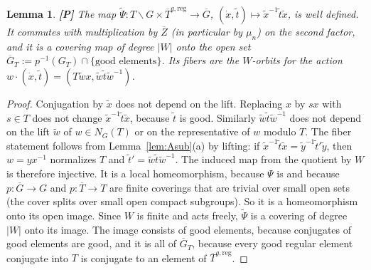 \documentclass[12pt]{article}
\newcommand{\ov}[1]{\overline{#1}}
\newcommand{\reg}{\mathrm{reg}}
\newcommand{\Gb}{\ov{G}}
\newcommand{\Zb}{\ov{Z}}
\newcommand{\Tb}{\ov{T}}
\newcommand{\Pv}{\textbf{[P]}}
\theoremstyle{plain}
\newtheorem{lemma}[theorem]{Lemma}
\theoremstyle{definition}
\begin{document}
\begin{lemma}\label{lem:Acover}\Pv
The map $\tilde\Psi:T\backslash G\times\Tb^{g,\reg}\to\Gb$, $(\dot x,\tilde t)\mapsto\tilde x^{-1}\tilde t\tilde x$, is well defined. It commutes with multiplication by $\Zb$ (in particular by $\mu_n$) on the second factor, and it is a covering map of degree $|W|$ onto the open set $\Gb_T:=p^{-1}(G_T)\cap\{\text{good elements}\}$. Its fibers are the $W$-orbits for the action $w\cdot(\dot x,\tilde t)=(T\tilde w x,\tilde w\tilde t\tilde w^{-1})$.
\end{lemma}
\begin{proof}
Conjugation by $\tilde x$ does not depend on the lift. Replacing $x$ by $sx$ with $s\in T$ does not change $\tilde x^{-1}\tilde t\tilde x$, because $\tilde t$ is good. Similarly $\tilde w\tilde t\tilde w^{-1}$ does not depend on the lift $\tilde w$ of $w\in N_G(T)$ or on the representative of $w$ modulo $T$. The fiber statement follows from Lemma~\ref{lem:Asub}(a) by lifting: if $\tilde x^{-1}\tilde t\tilde x=\tilde y^{-1}\tilde t'\tilde y$, then $w=yx^{-1}$ normalizes $T$ and $\tilde t'=\tilde w\tilde t\tilde w^{-1}$. The induced map from the quotient by $W$ is therefore injective. It is a local homeomorphism, because $\Psi$ is and because $p:\Gb\to G$ and $p:\Tb\to T$ are finite coverings that are trivial over small open sets (the cover splits over small open compact subgroups). So it is a homeomorphism onto its open image. Since $W$ is finite and acts freely, $\tilde\Psi$ is a covering of degree $|W|$ onto its image. The image consists of good elements, because conjugates of good elements are good, and it is all of $\Gb_T$, because every good regular element conjugate into $T$ is conjugate to an element of $\Tb^{g,\reg}$.
\end{proof}
\end{document}
